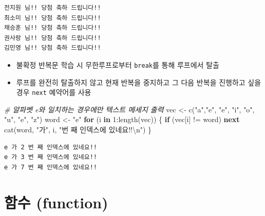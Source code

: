 \documentclass[
  11pt,
]{krantz}
\makeatletter
\newenvironment{Shaded}{\begin{snugshade}}{\end{snugshade}}
\newcommand{\CommentTok}[1]{\textcolor[rgb]{0.37,0.37,0.37}{\textit{#1}}}
\newcommand{\ControlFlowTok}[1]{\textcolor[rgb]{0.27,0.27,0.27}{\textbf{#1}}}
\newcommand{\DecValTok}[1]{\textcolor[rgb]{0.06,0.06,0.06}{#1}}
\newcommand{\FunctionTok}[1]{\textcolor[rgb]{0,0,0}{#1}}
\newcommand{\NormalTok}[1]{#1}
\newcommand{\OtherTok}[1]{\textcolor[rgb]{0.37,0.37,0.37}{#1}}
\newcommand{\SpecialCharTok}[1]{\textcolor[rgb]{0,0,0}{#1}}
\newcommand{\StringTok}[1]{\textcolor[rgb]{0.5,0.5,0.5}{#1}}
\providecommand{\tightlist}{%
  \setlength{\itemsep}{0pt}\setlength{\parskip}{0pt}}
\newenvironment{kframe}{%
\medskip{}
\setlength{\fboxsep}{.8em}
 \def\at@end@of@kframe{}%
 \ifinner\ifhmode%
  \def\at@end@of@kframe{\end{minipage}}%
  \begin{minipage}{\columnwidth}%
 \fi\fi%
 \def\FrameCommand##1{\hskip\@totalleftmargin \hskip-\fboxsep
 \colorbox{shadecolor}{##1}\hskip-\fboxsep
     \hskip-\linewidth \hskip-\@totalleftmargin \hskip\columnwidth}%
 \MakeFramed {\advance\hsize-\width
   \@totalleftmargin\z@ \linewidth\hsize
   \@setminipage}}%
 {\par\unskip\endMakeFramed%
 \at@end@of@kframe}
\newenvironment{rmdblock}[1]
  {
  \begin{itemize}
  \renewcommand{\labelitemi}{
    \raisebox{-.7\height}[0pt][0pt]{
      {\setkeys{Gin}{width=3em,keepaspectratio}\texttt{[image: images/\#1]}}
    }
  }
  \setlength{\fboxsep}{1em}
  \begin{kframe}
  \item
  }
  {
  \end{kframe}
  \end{itemize}
  }
\newenvironment{rmdnote}
  {\begin{rmdblock}{note}}
  {\end{rmdblock}}
\makeatother
\begin{document}
\begin{verbatim}
전지원 님!! 당첨 축하 드립니다!!
최소미 님!! 당첨 축하 드립니다!!
채승훈 님!! 당첨 축하 드립니다!!
권사랑 님!! 당첨 축하 드립니다!!
김민영 님!! 당첨 축하 드립니다!!
\end{verbatim}

\normalsize

\footnotesize

\begin{rmdnote}
\begin{itemize}
\tightlist
\item
  불확정 반복문 학습 시 무한루프로부터 \texttt{break}를 통해 루프에서 탈출
\item
  루프를 완전히 탈출하지 않고 현재 반복을 중지하고 그 다음 반복을 진행하고 싶을 경우 \texttt{next} 예약어를 사용
\end{itemize}
\end{rmdnote}

\normalsize

\footnotesize

\begin{Shaded}
\begin{Highlighting}[]
\CommentTok{\# 알파벳 e와 일치하는 경우에만 텍스트 메세지 출력}
\NormalTok{vec }\OtherTok{\textless{}{-}} \FunctionTok{c}\NormalTok{(}\StringTok{"a"}\NormalTok{,}\StringTok{"e"}\NormalTok{, }\StringTok{"e"}\NormalTok{, }\StringTok{"i"}\NormalTok{, }\StringTok{"o"}\NormalTok{, }\StringTok{"u"}\NormalTok{, }\StringTok{"e"}\NormalTok{, }\StringTok{"z"}\NormalTok{)}
\NormalTok{word }\OtherTok{\textless{}{-}} \StringTok{"e"}
\ControlFlowTok{for}\NormalTok{ (i }\ControlFlowTok{in} \DecValTok{1}\SpecialCharTok{:}\FunctionTok{length}\NormalTok{(vec)) \{}
  \ControlFlowTok{if}\NormalTok{ (vec[i] }\SpecialCharTok{!=}\NormalTok{ word) }\ControlFlowTok{next}
  \FunctionTok{cat}\NormalTok{(word, }\StringTok{"가"}\NormalTok{, i, }\StringTok{"번 째 인덱스에 있네요!!}\SpecialCharTok{\textbackslash{}n}\StringTok{"}\NormalTok{)}
\NormalTok{\}}
\end{Highlighting}
\end{Shaded}

\begin{verbatim}
e 가 2 번 째 인덱스에 있네요!!
e 가 3 번 째 인덱스에 있네요!!
e 가 7 번 째 인덱스에 있네요!!
\end{verbatim}

\normalsize

\hypertarget{function}{%
\section{함수 (function)}\label{function}}
\end{document}
